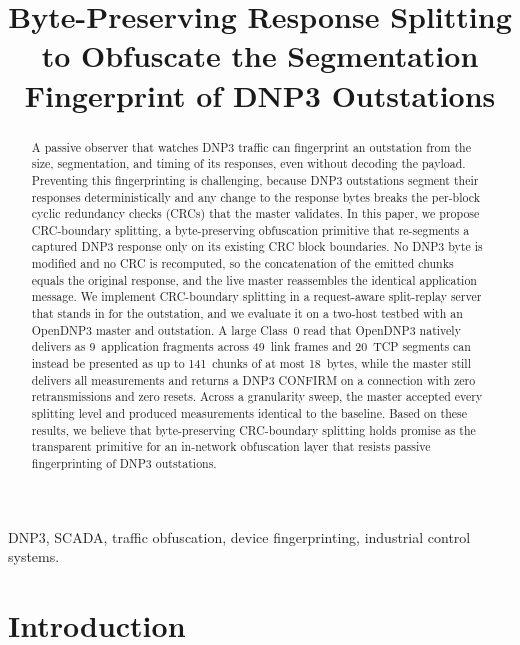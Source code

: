 \documentclass[conference]{IEEEtran}
\begin{document}
\title{Byte-Preserving Response Splitting to Obfuscate the Segmentation
Fingerprint of DNP3 Outstations}

\author{
}

\maketitle

\begin{abstract}
A passive observer that watches DNP3 traffic can fingerprint an outstation from
the size, segmentation, and timing of its responses, even without decoding the
payload. Preventing this fingerprinting is challenging, because DNP3 outstations
segment their responses deterministically and any change to the response bytes
breaks the per-block cyclic redundancy checks (CRCs) that the master validates.
In this paper, we propose CRC-boundary splitting, a byte-preserving obfuscation
primitive that re-segments a captured DNP3 response only on its existing CRC
block boundaries. No DNP3 byte is modified and no CRC is recomputed, so the
concatenation of the emitted chunks equals the original response, and the live
master reassembles the identical application message. We implement CRC-boundary
splitting in a request-aware split-replay server that stands in for the
outstation, and we evaluate it on a two-host testbed with an OpenDNP3 master and
outstation. A large Class~0 read that OpenDNP3 natively delivers as 9~application
fragments across 49~link frames and 20~TCP segments can instead be presented as
up to 141~chunks of at most 18~bytes, while the master still delivers all
measurements and returns a DNP3 CONFIRM on a connection with zero
retransmissions and zero resets. Across a granularity sweep, the master accepted
every splitting level and produced measurements identical to the baseline. Based
on these results, we believe that byte-preserving CRC-boundary splitting holds
promise as the transparent primitive for an in-network obfuscation layer that
resists passive fingerprinting of DNP3 outstations.
\end{abstract}

\begin{IEEEkeywords}
DNP3, SCADA, traffic obfuscation, device fingerprinting, industrial control
systems.
\end{IEEEkeywords}

\section{Introduction}
\end{document}
